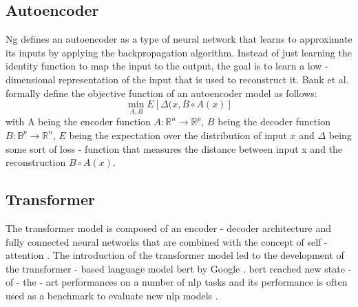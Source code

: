 \subsection{Autoencoder}
\label{chap:autoencoder}
Ng \cite{ng2011sparse} defines an autoencoder as a type of neural network that learns to approximate its inputs by applying the backpropagation algorithm. Instead of just learning the identity function to map the input to the output, the goal is to learn a low - dimensional representation of the input that is used to reconstruct it.
Bank et al. \cite{bank2021autoencoders} formally define the objective function of an autoencoder model as follows:
\begin{equation}
    \min_{A,B}E[\Delta(x, B \circ A(x)]
\end{equation}
with A being the encoder function $A: \mathbb{R}^{n} \to \mathbb{R}^{p}$, $B$ being the decoder function $B: \mathbb{B}^{p} \to \mathbb{R}^{n}$, $E$ being the expectation over the distribution of input $x$ and $\Delta$ being some sort of loss - function that measures the distance between input x and the reconstruction $B \circ A(x)$.

\subsection{Transformer}
The transformer model is composed of an encoder - decoder architecture and fully connected neural networks that are combined with the concept of self - attention \cite{vaswani2017attention}. The introduction of the transformer model led to the development of the transformer - based language model \acrfull{bert} by Google \cite{devlin2018bert}. \acrshort{bert} reached new state - of - the - art performances on a number of \acrfull{nlp} tasks and its performance is often used as a benchmark to evaluate new \acrshort{nlp} models .

